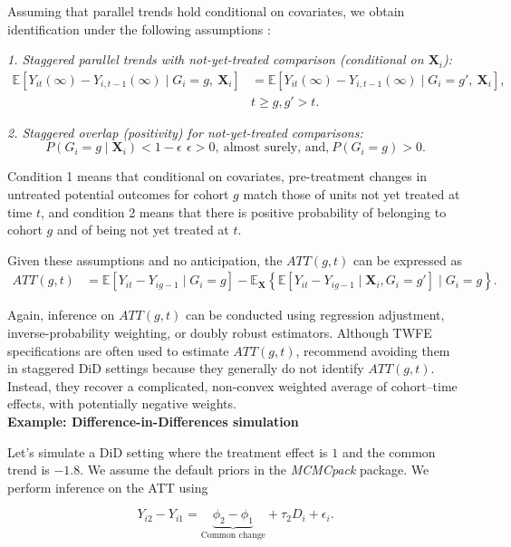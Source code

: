 Assuming that parallel trends hold conditional on covariates, we obtain identification under the following assumptions \cite{baker2025did_guide}:

\textit{1. Staggered parallel trends with not-yet-treated comparison (conditional on $\mathbf X_i$):}
\begin{align*}
\mathbb{E}\!\left[Y_{it}(\infty)-Y_{i,t-1}(\infty)\mid G_i=g,\ \mathbf X_i\right]
& =
\mathbb{E}\!\left[Y_{it}(\infty)-Y_{i,t-1}(\infty)\mid G_i=g',\ \mathbf X_i\right],
\\
& t\geq g, g'>t.
\end{align*}

\textit{2. Staggered overlap (positivity) for not-yet-treated comparisons:}
\[
P(G_i=g \mid \mathbf X_i) < 1 - \epsilon\, \ \epsilon >0, \ \text{almost surely, and,} \ P(G_i=g)>0.
\]

Condition 1 means that conditional on covariates, pre-treatment changes in untreated potential outcomes for cohort $g$ match those of units not yet treated at time $t$, and condition 2 means that there is positive probability of belonging to cohort $g$ and of being not yet treated at $t$.

Given these assumptions and no anticipation, the $ATT(g,t)$ can be expressed as
\begin{align*}
	ATT(g,t) &=\mathbb{E}[Y_{it} - Y_{ig-1} \mid G_i = g]-\mathbb{E}_{\mathbf{X}}\left\{\mathbb{E}[Y_{it} - Y_{ig-1} \mid\mathbf{X}_i,  G_i = g']\mid G_i=g\right\}.
\end{align*}

Again, inference on $ATT(g,t)$ can be conducted using regression adjustment, inverse-probability weighting, or doubly robust estimators. Although TWFE specifications are often used to estimate $ATT(g,t)$, \cite{baker2025did_guide} recommend avoiding them in staggered DiD settings because they generally do not identify $ATT(g,t)$. Instead, they recover a complicated, non-convex weighted average of cohort–time effects, with potentially negative weights.\\

\textbf{Example: Difference-in-Differences simulation}

Let's simulate a DiD setting where the treatment effect is $1$ and the common trend is $-1.8$. We assume the default priors in the \textit{MCMCpack} package. We perform inference on the ATT using

\[
Y_{i2} - Y_{i1}
= \underbrace{\phi_2 - \phi_1}_{\text{Common change}}
+ \tau_2 D_i + \epsilon_i.
\]

